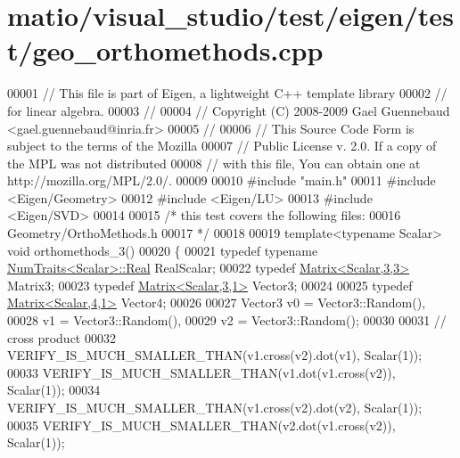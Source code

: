 \hypertarget{matio_2visual__studio_2test_2eigen_2test_2geo__orthomethods_8cpp_source}{}\section{matio/visual\+\_\+studio/test/eigen/test/geo\+\_\+orthomethods.cpp}
\label{matio_2visual__studio_2test_2eigen_2test_2geo__orthomethods_8cpp_source}

\begin{DoxyCode}
00001 \textcolor{comment}{// This file is part of Eigen, a lightweight C++ template library}
00002 \textcolor{comment}{// for linear algebra.}
00003 \textcolor{comment}{//}
00004 \textcolor{comment}{// Copyright (C) 2008-2009 Gael Guennebaud <gael.guennebaud@inria.fr>}
00005 \textcolor{comment}{//}
00006 \textcolor{comment}{// This Source Code Form is subject to the terms of the Mozilla}
00007 \textcolor{comment}{// Public License v. 2.0. If a copy of the MPL was not distributed}
00008 \textcolor{comment}{// with this file, You can obtain one at http://mozilla.org/MPL/2.0/.}
00009 
00010 \textcolor{preprocessor}{#include "main.h"}
00011 \textcolor{preprocessor}{#include <Eigen/Geometry>}
00012 \textcolor{preprocessor}{#include <Eigen/LU>}
00013 \textcolor{preprocessor}{#include <Eigen/SVD>}
00014 
00015 \textcolor{comment}{/* this test covers the following files:}
00016 \textcolor{comment}{   Geometry/OrthoMethods.h}
00017 \textcolor{comment}{*/}
00018 
00019 \textcolor{keyword}{template}<\textcolor{keyword}{typename} Scalar> \textcolor{keywordtype}{void} orthomethods\_3()
00020 \{
00021   \textcolor{keyword}{typedef} \textcolor{keyword}{typename} \hyperlink{group___core___module_struct_eigen_1_1_num_traits}{NumTraits<Scalar>::Real} RealScalar;
00022   \textcolor{keyword}{typedef} \hyperlink{group___core___module_class_eigen_1_1_matrix}{Matrix<Scalar,3,3>} Matrix3;
00023   \textcolor{keyword}{typedef} \hyperlink{group___core___module}{Matrix<Scalar,3,1>} Vector3;
00024 
00025   \textcolor{keyword}{typedef} \hyperlink{group___core___module_class_eigen_1_1_matrix}{Matrix<Scalar,4,1>} Vector4;
00026 
00027   Vector3 v0 = Vector3::Random(),
00028           v1 = Vector3::Random(),
00029           v2 = Vector3::Random();
00030 
00031   \textcolor{comment}{// cross product}
00032   VERIFY\_IS\_MUCH\_SMALLER\_THAN(v1.cross(v2).dot(v1), Scalar(1));
00033   VERIFY\_IS\_MUCH\_SMALLER\_THAN(v1.dot(v1.cross(v2)), Scalar(1));
00034   VERIFY\_IS\_MUCH\_SMALLER\_THAN(v1.cross(v2).dot(v2), Scalar(1));
00035   VERIFY\_IS\_MUCH\_SMALLER\_THAN(v2.dot(v1.cross(v2)), Scalar(1));

\end{DoxyCode}
